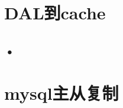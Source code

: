 \documentclass[12pt,a4paper,openany,fleqn]{book} %
\begin{document}
  
\tableofcontents

%
\chapter{DAL到cache}
\section{•}

%
\chapter{mysql主从复制}
\end{document}

